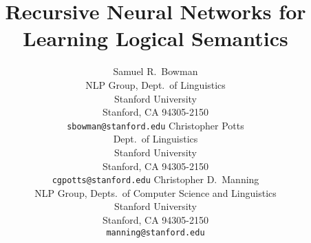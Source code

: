 \documentclass{article} %
\title{Recursive Neural Networks for Learning Logical Semantics}
\author{
Samuel R.\ Bowman \\
NLP Group, Dept.\ of Linguistics\\
Stanford University\\
Stanford, CA 94305-2150 \\
\texttt{sbowman@stanford.edu}
 \And
 Christopher Potts \\
Dept.\ of Linguistics\\
Stanford University\\
Stanford, CA 94305-2150 \\
\texttt{cgpotts@stanford.edu}
 \And
Christopher D.\ Manning \\
NLP Group,  Depts.\ of Computer Science and Linguistics\\
Stanford University\\
Stanford, CA 94305-2150 \\
\texttt{manning@stanford.edu}
}
\begin{document}
\maketitle













\small %
 
\end{document}
